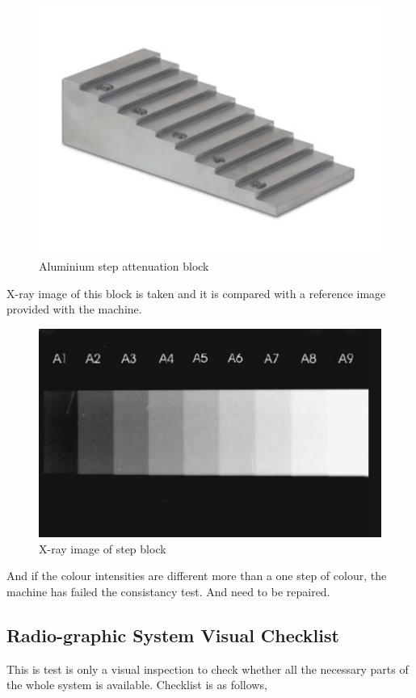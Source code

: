 \documentclass[12pt]{article}
\begin{document}
\begin{figure}[h!]
  \centering
  \includegraphics[width=0.3\linewidth]{att.jpg}
  \caption{\small{Aluminium step attenuation block}}
  \label{fig:Aluminium step attenuation block}
\end{figure}

X-ray image of this block is taken and it is compared with a reference image provided with the machine.

\begin{figure}[h!]
  \centering
  \includegraphics[width=0.3\linewidth]{attref.jpg}
  \caption{\small{X-ray image of step block}}
  \label{fig:X-ray image of step block}
\end{figure}

And if the colour intensities are different more than a one step of colour, the machine has failed the consistancy test. And need to be repaired. 

\subsection{Radio-graphic System Visual Checklist}

This is test is only a visual inspection to check whether all the necessary parts of the whole system is available. Checklist is as follows, 
\end{document}
